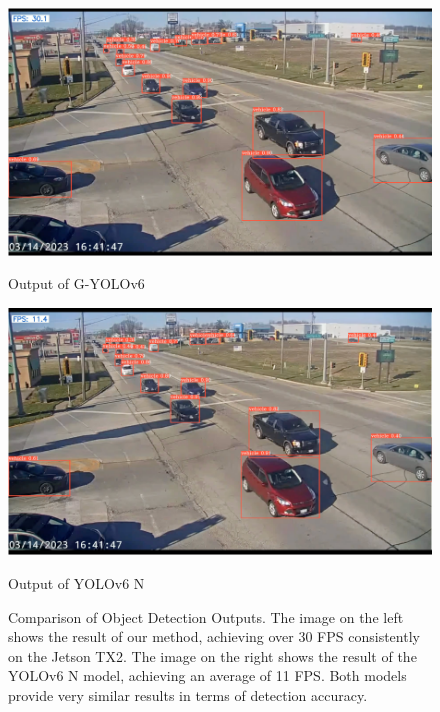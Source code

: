 \begin{figure}[htbp]
    \centering
    \begin{minipage}[b]{0.48\textwidth}
        \centering
        \includegraphics[width=\textwidth]{figures/Picture1.png}
        \caption{Output of G-YOLOv6}
        \label{fig:our_method}
    \end{minipage}
    \hfill
    \begin{minipage}[b]{0.48\textwidth}
        \centering
        \includegraphics[width=\textwidth]{figures/Picture2.png}
        \caption{Output of YOLOv6 N}
        \label{fig:yolov6}
    \end{minipage}
    \caption{Comparison of Object Detection Outputs. The image on the left shows the result of our method, achieving over 30 FPS consistently on the Jetson TX2. The image on the right shows the result of the YOLOv6 N model, achieving an average of 11 FPS. Both models provide very similar results in terms of detection accuracy.}
    \label{fig:comparison}
\end{figure}

\clearpage
